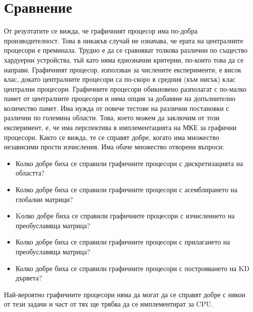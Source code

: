 \documentclass[12pt]{report}
\begin{document}
\section{Сравнение}
От резултатите се вижда, че графичният процесор има по-добра производителност. Това в никакъв случай не означава, че ерата на централните процесори е преминала. Трудно е да се сравняват толкова различни по същество хардуерни устройства, тъй като няма еднозначни критерии, по-които това да се направи. Графичният процесор, използван за числените експерименти, е висок клас, докато централните процесори са по-скоро в средния (към нисък) клас централни процесори. Графичните процесори обикновено разполагат с по-малко памет от централните процесори и няма опция за добавяне на допълнително количество памет. Има нужда от повече тестове на различни постановки с различни по големина области. Това, което можем да заключим от този експеримент, е, че има перспектива в имплементацията на МКЕ за графични процесори. Както се вижда, те се справят добре, когато има множество независими прости изчисления. Има обаче множество отворени въпроси:
\begin{itemize}
\item Колко добре биха се справили графичните процесори с дискретизацията на областта?
\item Колко добре биха се справили графичните процесори с асемблирането на глобални матрици?
\item Kолко добре биха се справили графичните процесори с изчислението на преобуславяща матрица?
\item Колко добре биха се справили графичните процесори с прилагането на преобуславяща матрица?
\item Колко добре биха се справили графичните процесори с построяването на KD дървета?
\end{itemize}
Най-вероятно графичните процесори няма да могат да се справят добре с някои от тези задачи и част от тях ще трябва да се имплементират за CPU.
\end{document}
